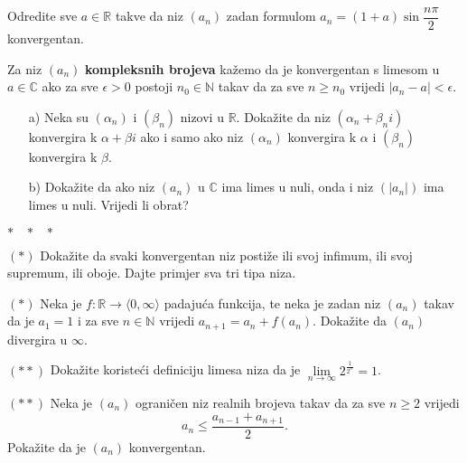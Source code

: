 \begin{exercise}
Odredite sve $a\in \mathbb{R}$ takve da niz $(a_n)$ zadan formulom $a_n=(1+a)\sin{\dfrac{n\pi}{2}}$ konvergentan.
\end{exercise}

\begin{definition}
Za niz $(a_n)$ \textbf{kompleksnih brojeva} kažemo da je konvergentan s limesom u $a\in \mathbb{C}$ ako za sve $\epsilon>0$ postoji $n_0\in \mathbb{N}$ takav da za sve $n\geq n_0$ vrijedi $|a_n-a|<\epsilon$.
\end{definition}

\begin{exercise} \textbf{}
\begin{itemize}
\item[a)] Neka su $(\alpha_n)$ i $(\beta_n)$ nizovi u $\mathbb{R}$. Dokažite da niz $(\alpha_n+\beta_n i)$ konvergira k $\alpha+\beta i$ ako i samo ako niz $(\alpha_n)$ konvergira k $\alpha$ i $(\beta_n)$ konvergira k $\beta$.
\item[b)] Dokažite da ako niz $(a_n)$ u $\mathbb{C}$ ima limes u nuli, onda i niz $(|a_n|)$ ima limes u nuli. Vrijedi li obrat?
\end{itemize}
\end{exercise}
\begin{center}
$*\hspace{0.3cm}*\hspace{0.3cm}*\hspace{0.3cm}$
\end{center}
\begin{exercise} $(*)$
Dokažite da svaki konvergentan niz postiže ili svoj infimum, ili svoj supremum, ili oboje. Dajte primjer sva tri tipa niza.
\end{exercise}
\begin{exercise} $(*)$
Neka je $f : \mathbb{R}\to \langle 0, \infty\rangle$ padajuća funkcija, te neka je zadan niz $(a_n)$ takav da je $a_1=1$ i za sve $n\in \mathbb{N}$ vrijedi $a_{n+1}=a_n+f(a_n)$. Dokažite da $(a_n)$ divergira u $\infty$.
\end{exercise}
\begin{exercise} $(**)$
Dokažite koristeći definiciju limesa niza da je $\lim\limits_{n\to \infty}{2^{\frac{1}{2^n}}}=1$.
\end{exercise}
\begin{exercise} $(**)$
Neka je $(a_n)$ ograničen niz realnih brojeva takav da za sve $n\geq 2$ vrijedi
$$a_n\leq \dfrac{a_{n-1}+a_{n+1}}{2}.$$
Pokažite da je $(a_n)$ konvergentan.
\end{exercise}